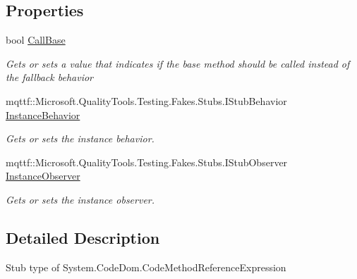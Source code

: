 \subsection*{Properties}
\begin{DoxyCompactItemize}
\item 
bool \hyperlink{class_system_1_1_code_dom_1_1_fakes_1_1_stub_code_method_reference_expression_a420a37adf1d7fcdc23c32b04f1852bfa}{Call\-Base}
\begin{DoxyCompactList}\small\item\em Gets or sets a value that indicates if the base method should be called instead of the fallback behavior\end{DoxyCompactList}\item 
mqttf\-::\-Microsoft.\-Quality\-Tools.\-Testing.\-Fakes.\-Stubs.\-I\-Stub\-Behavior \hyperlink{class_system_1_1_code_dom_1_1_fakes_1_1_stub_code_method_reference_expression_ab04e4ceac4632742cbd44e0375e3d0f7}{Instance\-Behavior}
\begin{DoxyCompactList}\small\item\em Gets or sets the instance behavior.\end{DoxyCompactList}\item 
mqttf\-::\-Microsoft.\-Quality\-Tools.\-Testing.\-Fakes.\-Stubs.\-I\-Stub\-Observer \hyperlink{class_system_1_1_code_dom_1_1_fakes_1_1_stub_code_method_reference_expression_a9e7459f260da8ce6b2cdcce29fe25b1e}{Instance\-Observer}
\begin{DoxyCompactList}\small\item\em Gets or sets the instance observer.\end{DoxyCompactList}\end{DoxyCompactItemize}


\subsection{Detailed Description}
Stub type of System.\-Code\-Dom.\-Code\-Method\-Reference\-Expression



